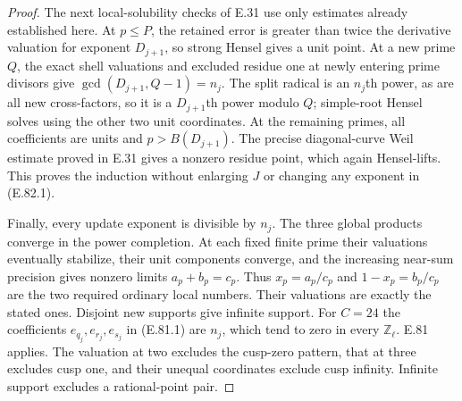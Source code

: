 \begin{proof}
The next local-solubility checks of E.31 use only estimates
already established here. At $p\leq P$, the retained error
is greater than twice the derivative valuation for exponent
$D_{j+1}$, so strong Hensel gives a unit point. At a new prime
$Q$, the exact shell valuations and excluded residue one
at newly entering prime divisors give
$\gcd(D_{j+1},Q-1)=n_j$. The split radical is an
$n_j$th power, as are all new cross-factors, so it is a
$D_{j+1}$th power modulo $Q$; simple-root Hensel solves
using the other two unit coordinates. At the remaining
primes, all coefficients are units and $p>B(D_{j+1})$.
The precise diagonal-curve Weil estimate proved in E.31
gives a nonzero residue point, which again Hensel-lifts.
This proves the induction without enlarging $J$ or changing
any exponent in (E.82.1).

Finally, every update exponent is divisible by $n_j$.
The three global products converge in the power completion.
At each fixed finite prime their valuations eventually
stabilize, their unit components converge, and the increasing
near-sum precision gives nonzero limits $a_p+b_p=c_p$.
Thus $x_p=a_p/c_p$ and $1-x_p=b_p/c_p$ are the two required
ordinary local numbers. Their valuations are exactly the
stated ones. Disjoint new supports give infinite support.
For $C=24$ the coefficients $e_{q_j},e_{r_j},e_{s_j}$ in
(E.81.1) are $n_j$, which tend to zero in every $\mathbb Z_\ell$.
E.81 applies. The valuation at two excludes the cusp-zero
pattern, that at three excludes cusp one, and their unequal
coordinates exclude cusp infinity. Infinite support excludes
a rational-point pair.
\end{proof}

